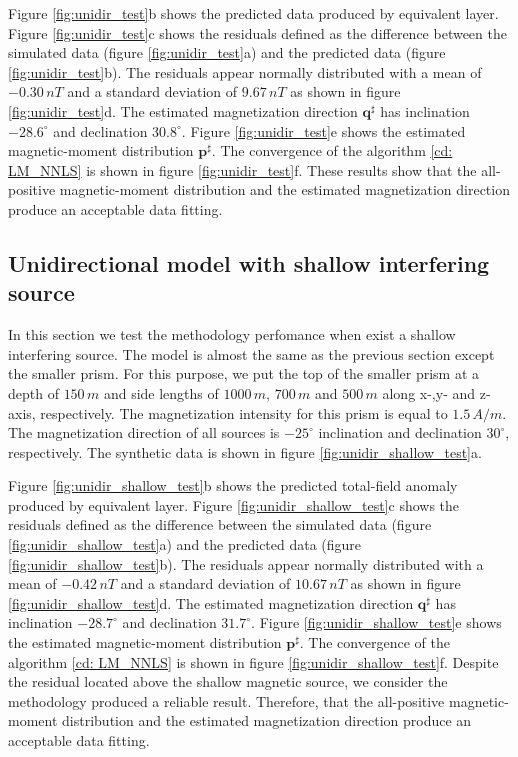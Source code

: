 Figure \ref{fig:unidir_test}b shows the predicted data produced by equivalent layer. 
Figure \ref{fig:unidir_test}c shows the residuals defined as the difference between the simulated data (figure \ref{fig:unidir_test}a) and the predicted data (figure \ref{fig:unidir_test}b). The residuals appear normally distributed with a mean of $-0.30 \, nT$ and a standard deviation of $9.67 \, nT$ as shown in figure \ref{fig:unidir_test}d. The estimated magnetization direction $\mathbf{q}^\sharp$ has inclination $-28.6^\circ$ and declination $30.8^\circ$. Figure \ref{fig:unidir_test}e shows the estimated magnetic-moment distribution $\mathbf{p}^\sharp$. The convergence of the algorithm \ref{cd: LM_NNLS} is shown in figure \ref{fig:unidir_test}f. These results show that the all-positive magnetic-moment distribution and the estimated magnetization direction produce an acceptable data fitting.

\subsection{Unidirectional model with shallow interfering source}

In this section we test the methodology perfomance when exist a shallow interfering source. The model is almost the same as the previous section except the smaller prism. For this purpose, we put the top of the smaller prism at a depth of $150 \, m$ and side lengths of $1000 \, m$, $700 \, m$ and $500 \, m$ along x-,y- and z-axis, respectively. The magnetization intensity for this prism is equal to $1.5 \, A/m$. The magnetization direction of all sources is $-25^\circ$ inclination and declination $30^\circ$, respectively. The synthetic data is shown in figure \ref{fig:unidir_shallow_test}a.

Figure \ref{fig:unidir_shallow_test}b shows the predicted total-field anomaly produced by equivalent layer. Figure \ref{fig:unidir_shallow_test}c shows the residuals defined as the difference between the simulated data (figure \ref{fig:unidir_shallow_test}a) and the predicted data (figure \ref{fig:unidir_shallow_test}b). The residuals appear normally distributed with a mean of $-0.42 \, nT$ and a standard deviation of $10.67 \, nT$ as shown in figure \ref{fig:unidir_shallow_test}d. The estimated magnetization direction $\mathbf{q}^\sharp$ has inclination $-28.7^\circ$ and declination $31.7^\circ$. Figure \ref{fig:unidir_shallow_test}e shows the estimated magnetic-moment distribution $\mathbf{p}^\sharp$. The convergence of the algorithm \ref{cd: LM_NNLS} is shown in figure \ref{fig:unidir_shallow_test}f. Despite the residual located above the shallow magnetic source, we consider the methodology produced a reliable result. Therefore, that the all-positive magnetic-moment distribution and the estimated magnetization direction produce an acceptable data fitting. 

